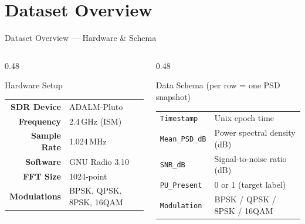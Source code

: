 \documentclass[aspectratio=169, 10pt]{beamer}
\begin{document}
\section{Dataset Overview}
\begin{frame}{Dataset Overview --- Hardware \& Schema}
\small
\begin{columns}[T]
\begin{column}{0.48\textwidth}
\begin{block}{Hardware Setup}
\footnotesize
\renewcommand{\arraystretch}{1.2}
\begin{tabular}{@{}rl@{}}
\textbf{SDR Device}  & ADALM-Pluto \\
\textbf{Frequency}   & 2.4\,GHz (ISM) \\
\textbf{Sample Rate} & 1.024\,MHz \\
\textbf{Software}    & GNU Radio 3.10 \\
\textbf{FFT Size}    & 1024-point \\
\textbf{Modulations} & BPSK, QPSK, 8PSK, 16QAM \\
\end{tabular}
\end{block}
\end{column}

\begin{column}{0.48\textwidth}
\begin{block}{Data Schema (per row = one PSD snapshot)}
\footnotesize
\renewcommand{\arraystretch}{1.2}
\begin{tabular}{@{}ll@{}}
\texttt{Timestamp}     & Unix epoch time \\
\texttt{Mean\_PSD\_dB} & Power spectral density (dB) \\
\texttt{SNR\_dB}       & Signal-to-noise ratio (dB) \\
\texttt{PU\_Present}   & 0 or 1 (target label) \\
\texttt{Modulation}    & BPSK / QPSK / 8PSK / 16QAM \\
\end{tabular}
\end{block}
\end{column}
\end{columns}

\vspace{4pt}


\end{frame}
\end{document}
